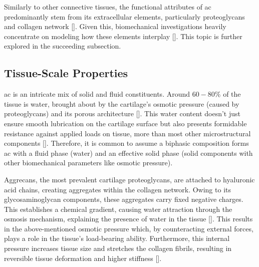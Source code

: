 \documentclass[12pt,a4paper]{report}
\begin{document}
Similarly to other connective tissues, the functional attributes of \ac{ac} predominantly stem from its extracellular elements, particularly proteoglycans and collagen network [\cite{culav1999,brody2015}]. Given this, biomechanical investigations heavily concentrate on modeling how these elements interplay [\cite{klika2016,ebrahimi2019,sajjadinia2019,lin2021,paz2022}]. This topic is further explored in the succeeding subsection.

\subsection{Tissue-Scale Properties}
\Ac{ac} is an intricate mix of solid and fluid constituents. Around $60-80\%$ of the tissue is water, brought about by the cartilage's osmotic pressure (caused by proteoglycans) and its porous architecture [\cite{cederlund2022}]. This water content doesn't just ensure smooth lubrication on the cartilage surface but also presents formidable resistance against applied loads on tissue, more than most other microstructural components [\cite{quiroga2017,sajjadinia2019}]. Therefore, it is common to assume a biphasic composition forms \ac{ac} with a fluid phase (water) and an effective solid phase (solid components with other biomechanical parameters like osmotic pressure).

Aggrecans, the most prevalent cartilage proteoglycans, are attached to hyaluronic acid chains, creating aggregates within the collagen network. Owing to its glycosaminoglycan components, these aggregates carry fixed negative charges. This establishes a chemical gradient, causing water attraction through the osmosis mechanism, explaining the presence of water in the tissue [\cite{kiani2002,gomez2020,johnson2021}]. This results in the above-mentioned osmotic pressure which, by counteracting external forces, plays a role in the tissue's load-bearing ability. Furthermore, this internal pressure increases tissue size and stretches the collagen fibrils, resulting in reversible tissue deformation and higher stiffness [\cite{dudhia2005}].
\end{document}
